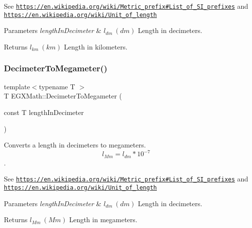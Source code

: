 See \href{https://en.wikipedia.org/wiki/Metric_prefix#List_of_SI_prefixes}{\tt https\+://en.\+wikipedia.\+org/wiki/\+Metric\+\_\+prefix\#\+List\+\_\+of\+\_\+\+S\+I\+\_\+prefixes} and \href{https://en.wikipedia.org/wiki/Unit_of_length}{\tt https\+://en.\+wikipedia.\+org/wiki/\+Unit\+\_\+of\+\_\+length} 
\begin{DoxyParams}{Parameters}
{\em length\+In\+Decimeter} & $ l_{dm}\ (dm)$ Length in decimeters. \\
\hline
\end{DoxyParams}
\begin{DoxyReturn}{Returns}
$ l_{km}\ (km)$ Length in kilometers. 
\end{DoxyReturn}
\mbox{\label{group___e_g_x_math-_conversions-_length_conversions-_s_i-_decimeter-_s_i_ga093ff7a928de0bc92d2dd57c2c3d0a60}} 
\subsubsection{\texorpdfstring{Decimeter\+To\+Megameter()}{DecimeterToMegameter()}}
{\footnotesize\ttfamily template$<$typename T $>$ \\
T E\+G\+X\+Math\+::\+Decimeter\+To\+Megameter (\begin{DoxyParamCaption}\item[{const T}]{length\+In\+Decimeter }\end{DoxyParamCaption})}



Converts a length in decimeters to megameters. \[ l_{Mm}=l_{dm} * 10^{-7} \]. 

See \href{https://en.wikipedia.org/wiki/Metric_prefix#List_of_SI_prefixes}{\tt https\+://en.\+wikipedia.\+org/wiki/\+Metric\+\_\+prefix\#\+List\+\_\+of\+\_\+\+S\+I\+\_\+prefixes} and \href{https://en.wikipedia.org/wiki/Unit_of_length}{\tt https\+://en.\+wikipedia.\+org/wiki/\+Unit\+\_\+of\+\_\+length} 
\begin{DoxyParams}{Parameters}
{\em length\+In\+Decimeter} & $ l_{dm}\ (dm)$ Length in decimeters. \\
\hline
\end{DoxyParams}
\begin{DoxyReturn}{Returns}
$ l_{Mm}\ (Mm)$ Length in megameters. 
\end{DoxyReturn}
\mbox{\label{group___e_g_x_math-_conversions-_length_conversions-_s_i-_decimeter-_s_i_ga51fdff755420d79cc7c4cab051a1e820}} 
